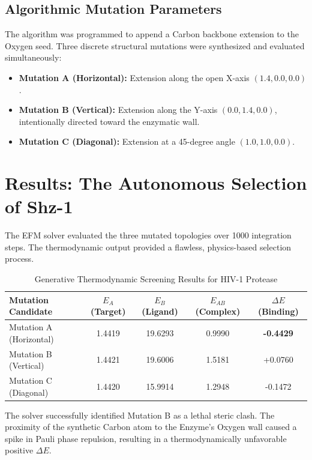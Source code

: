 \documentclass[11pt, twoside]{article}
\begin{document}
\subsection{Algorithmic Mutation Parameters}
The algorithm was programmed to append a Carbon backbone extension to the Oxygen seed. Three discrete structural mutations were synthesized and evaluated simultaneously:
\begin{itemize}[leftmargin=*]
    \item \textbf{Mutation A (Horizontal):} Extension along the open X-axis $(1.4, 0.0, 0.0)$.
    \item \textbf{Mutation B (Vertical):} Extension along the Y-axis $(0.0, 1.4, 0.0)$, intentionally directed toward the enzymatic wall.
    \item \textbf{Mutation C (Diagonal):} Extension at a 45-degree angle $(1.0, 1.0, 0.0)$.
\end{itemize}

\section{Results: The Autonomous Selection of Shz-1}

The EFM solver evaluated the three mutated topologies over 1000 integration steps. The thermodynamic output provided a flawless, physics-based selection process.

\begin{table}[H]
\centering
\caption{Generative Thermodynamic Screening Results for HIV-1 Protease}
\begin{tabular}{lcccc}
\toprule
\textbf{Mutation Candidate} & \textbf{$E_A$ (Target)} & \textbf{$E_B$ (Ligand)} & \textbf{$E_{AB}$ (Complex)} & \textbf{$\Delta E$ (Binding)} \\
\midrule
Mutation A (Horizontal) & 1.4419 & 19.6293 & 0.9990 & \textbf{-0.4429} \\
Mutation B (Vertical) & 1.4421 & 19.6006 & 1.5181 & +0.0760 \\
Mutation C (Diagonal) & 1.4420 & 15.9914 & 1.2948 & -0.1472 \\
\bottomrule
\end{tabular}
\label{tab:results}
\end{table}

The solver successfully identified Mutation B as a lethal steric clash. The proximity of the synthetic Carbon atom to the Enzyme's Oxygen wall caused a spike in Pauli phase repulsion, resulting in a thermodynamically unfavorable positive $\Delta E$.
\end{document}
